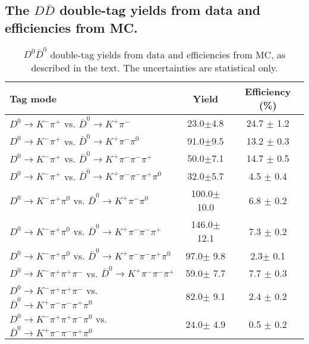 \documentclass[aps,preprint,tightenlines,superscriptaddress,showpacs,byrevtex,amsmath,amssymb,nofloatfix]{revtex4}
\begin{document}
\begin{appendix}

 \section{The $D\bar{D}$ double-tag yields from data and efficiencies from MC.}

\begin{table}[!htbp]
\caption{\small $D^{0}\bar{D}^{0}$  double-tag yields from data and efficiencies from MC, as described in the text. The uncertainties are statistical only.}
\label{sys_err_gamX}
\begin{tabular}{l| c |c }
\hline
     Tag mode     & Yield &  Efficiency (\%)   \\
    \hline
    $D^{0} \rightarrow K^{-}\pi^{+} $ vs. $\bar{D}^{0} \rightarrow K^{+}\pi^{-}$& 23.0$\pm$4.8& 24.7 $\pm$ 1.2  \\
    $D^{0} \rightarrow K^{-}\pi^{+} $ vs. $\bar{D}^{0} \rightarrow K^{+}\pi^{-}\pi^{0}$& 91.0$\pm$9.5 & 13.2 $\pm$ 0.3  \\
    $D^{0} \rightarrow K^{-}\pi^{+} $ vs. $\bar{D}^{0} \rightarrow K^{+}\pi^{-}\pi^{-}\pi^{+}$ & 50.0$\pm$7.1 & 14.7 $\pm$ 0.5  \\
    $D^{0} \rightarrow K^{-}\pi^{+} $ vs. $\bar{D}^{0} \rightarrow K^{+}\pi^{-}\pi^{-}\pi^{+}\pi^{0}$ & 32.0$\pm$5.7  &  4.5 $\pm$ 0.4\\
    $D^{0} \rightarrow K^{-}\pi^{+}\pi^{0}$ vs. $\bar{D}^{0} \rightarrow K^{+}\pi^{-}\pi^{0}$   &100.0$\pm$10.0  &6.8 $\pm$ 0.2\\
    $D^{0} \rightarrow K^{-}\pi^{+}\pi^{0}$ vs. $\bar{D}^{0} \rightarrow K^{+}\pi^{-}\pi^{-}\pi^{+}$ &146.0$\pm$12.1    &7.3 $\pm$ 0.2\\
    $D^{0} \rightarrow K^{-}\pi^{+}\pi^{0}$ vs. $\bar{D}^{0} \rightarrow K^{+}\pi^{-}\pi^{-}\pi^{+}\pi^{0}$ &97.0$\pm$ 9.8   &  2.3$\pm$  0.1 \\
    $D^{0} \rightarrow K^{-}\pi^{+}\pi^{+}\pi^{-}$ vs. $\bar{D}^{0} \rightarrow K^{+}\pi^{-}\pi^{-}\pi^{+}$ &  59.0$\pm$ 7.7  &7.7 $\pm$ 0.3    \\
    $D^{0} \rightarrow K^{-}\pi^{+}\pi^{+}\pi^{-}$ vs.  $\bar{D}^{0} \rightarrow K^{+}\pi^{-}\pi^{-}\pi^{+}\pi^{0}$ & 82.0$\pm$ 9.1 & 2.4 $\pm$ 0.2 \\
    $D^{0} \rightarrow K^{-}\pi^{+}\pi^{+}\pi^{-}\pi^{0}$ vs. $\bar{D}^{0} \rightarrow K^{+}\pi^{-}\pi^{-}\pi^{+}\pi^{0}$ & 24.0$\pm$ 4.9&  0.5 $\pm$ 0.2 \\
    \hline
\end{tabular}
\end{table}


\end{appendix}
\end{document}

